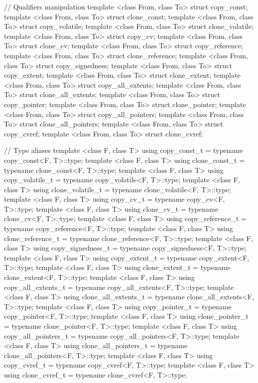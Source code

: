 \documentclass[ebook,10pt,oneside,openany,final]{memoir}
\begin{document}
\begin{codeblock}
// Qualifiers manipulation
template <class From, class To> struct copy_const;
template <class From, class To> struct clone_const;
template <class From, class To> struct copy_volatile;
template <class From, class To> struct clone_volatile;
template <class From, class To> struct copy_cv;
template <class From, class To> struct clone_cv;
template <class From, class To> struct copy_reference;
template <class From, class To> struct clone_reference;
template <class From, class To> struct copy_signedness;
template <class From, class To> struct copy_extent;
template <class From, class To> struct clone_extent;
template <class From, class To> struct copy_all_extents;
template <class From, class To> struct clone_all_extents;
template <class From, class To> struct copy_pointer;
template <class From, class To> struct clone_pointer;
template <class From, class To> struct copy_all_pointers;
template <class From, class To> struct clone_all_pointers;
template <class From, class To> struct copy_cvref;
template <class From, class To> struct clone_cvref;

// Type aliases
template <class F, class T> using copy_const_t = typename copy_const<F, T>::type;
template <class F, class T> using clone_const_t = typename clone_const<F, T>::type;
template <class F, class T> using copy_volatile_t = typename copy_volatile<F, T>::type;
template <class F, class T> using clone_volatile_t = typename clone_volatile<F, T>::type;
template <class F, class T> using copy_cv_t = typename copy_cv<F, T>::type;
template <class F, class T> using clone_cv_t = typename clone_cv<F, T>::type;
template <class F, class T> using copy_reference_t = typename copy_reference<F, T>::type;
template <class F, class T> using clone_reference_t = typename clone_reference<F, T>::type;
template <class F, class T> using copy_signedness_t = typename copy_signedness<F, T>::type;
template <class F, class T> using copy_extent_t = typename copy_extent<F, T>::type;
template <class F, class T> using clone_extent_t = typename clone_extent<F, T>::type;
template <class F, class T> using copy_all_extents_t = typename copy_all_extents<F, T>::type;
template <class F, class T> using clone_all_extents_t = typename clone_all_extents<F, T>::type;
template <class F, class T> using copy_pointer_t = typename copy_pointer<F, T>::type;
template <class F, class T> using clone_pointer_t = typename clone_pointer<F, T>::type;
template <class F, class T> using copy_all_pointers_t = typename copy_all_pointers<F, T>::type;
template <class F, class T> using clone_all_pointers_t = typename clone_all_pointers<F, T>::type;
template <class F, class T> using copy_cvref_t = typename copy_cvref<F, T>::type;
template <class F, class T> using clone_cvref_t = typename clone_cvref<F, T>::type;
\end{codeblock}
\end{document}
